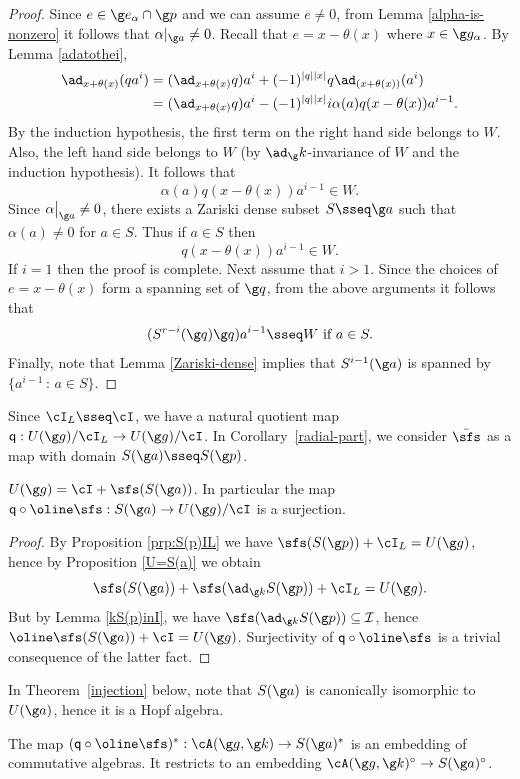 \documentclass[11pt]{amsart}
\begin{document}
\begin{proof}
Since $e\in \g e_\alpha\cap\g p$ and we can assume $e\neq 0$, from
Lemma \ref{alpha-is-nonzero} it follows that $\alpha|_{\g a}\neq 0$.	Recall that  $e=x-\theta(x)$ where $x\in\g g_\alpha$. By Lemma \ref{adatothei}, 
	\begin{align*}
	\ad_{x+\theta(x)}(qa^i)&=(\ad_{x+\theta(x)}q)a^i
	+(-1)^{|q||x|}q\ad_{(x+\theta(x))}(a^i)\\
	&=(\ad_{x+\theta(x)}q)a^i
	-(-1)^{|q||x|}i\alpha(a)q(x-\theta(x))a^{i-1}.
	\end{align*}
	By the induction hypothesis, the first term on the right hand side belongs to $W$. Also, the left hand side belongs to $W$ (by $\ad_\g k$-invariance of $W$ and the induction hypothesis). It follows that
	\[
	\alpha(a)q(x-\theta(x))a^{i-1}\in W.
	\]
Since $\alpha\big|_{\g a}\neq 0$, there exists  a Zariski dense subset $S\sseq \g a$ such that  $\alpha(a)\neq 0$ for $a\in S$. Thus if $a\in S$ then 
	\[
	q(x-\theta(x))a^{i-1}\in W.
	\]
If $i=1$ then the proof is complete. Next assume that $i>1$. 	Since the choices of $e=x-\theta(x)$ form a spanning set of $\g q$, from the above arguments it follows that
	\[
	(S^{r-i}(\g q)\g q)a^{i-1}\sseq W\text{ if }
	a\in S.
	\]
Finally, note that Lemma \ref{Zariski-dense} implies that  $S^{i-1}(\g a)$ is spanned by 
$\{a^{i-1}\,:\,a\in S\}$. 
\end{proof}
Since $\cI_L\sseq \cI$, 
we have a natural quotient map
 $\mathsf{q}:U(\g g)/\cI_L\to U(\g g)/\cI$. In Corollary~\ref{radial-part}, we consider $\bar\sfs$ as a map with domain $S(\g a)\sseq S(\g p)$. 
\begin{cor}\label{radial-part}
	$U(\g g)=\cI+\sfs(S(\g a))$. In particular the map 
	$\mathsf q\circ \oline \sfs:S(\g a)\to U(\g g)/\cI$ is a surjection.
\end{cor}
\begin{proof}
By Proposition \ref{prp:S(p)IL} we have $
\sfs(S(\g p))+\cI_L=U(\g g)$, hence by Proposition \ref{U=S(a)} we obtain
\[\sfs(S(\g a))+\sfs({\ad}_{\g k}S(\g p))+\cI_L=U(\g g).
\] 
But by Lemma \ref{kS(p)inI}, we have  $\sfs({\ad}_{\g k}S(\g p))\subseteq \mathcal{I}$, hence  $\oline\sfs(S(\g a))+\cI=U(\g g)$.
Surjectivity of $\mathsf q\circ\oline\sfs$ is a trivial consequence of the latter fact. 
\end{proof}

In Theorem~\ref{injection} below, note that
$S(\g a)$ is canonically isomorphic to $U(\g a)$, hence it is a Hopf algebra. 

\begin{thm}\label{injection}
	The map 
	$(\mathsf q\circ\oline\sfs)^*:\cA(\g g,\g k)\to S(\g a)^*$   is an  embedding of commutative algebras. It restricts to an embedding $\cA(\g g,\g k)^\circ\to S(\g a)^\circ$. 
\end{thm}
\end{document}
